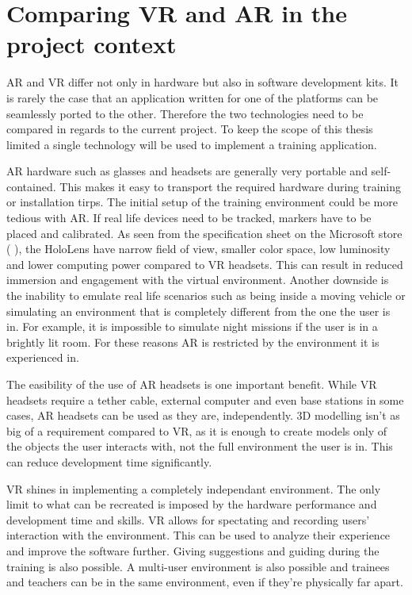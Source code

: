 \documentclass[12pt, a4paper,oneside, nocenter]{thesis}
\newcommand{\citeyeartitlexamkinline}[1]{(\usebibentry{#1}{title} \citeyear{#1})}
\begin{document}
\section{Comparing VR and AR in the project context}
AR and VR differ not only in hardware but also in software development kits. It is rarely the case that an application written for one of the platforms can be seamlessly ported to the other. Therefore the two technologies need to be compared in regards to the current project. To keep the scope of this thesis limited a single technology will be used to implement a training application.
\par
AR hardware such as glasses and headsets are generally very portable and self-contained. This makes it easy to transport the required hardware during training or installation tirps. The initial setup of the training environment could be more tedious with AR. If real life devices need to be tracked, markers have to be placed and calibrated. As seen from the specification sheet on the Microsoft store \citeyeartitlexamkinline{hololens-specs}, the HoloLens have narrow field of view, smaller color space, low luminosity and lower computing power compared to VR headsets. This can result in reduced immersion and engagement with the virtual environment. Another downside is the inability to emulate real life scenarios such as being inside a moving vehicle or simulating an environment that is completely different from the one the user is in. For example, it is impossible to simulate night missions if the user is in a brightly lit room. For these reasons AR is restricted by the environment it is experienced in.
\par
The easibility of the use of AR headsets is one important benefit. While VR headsets require a tether cable, external computer and even base stations in some cases, AR headsets can be used as they are, independently. 3D modelling isn't as big of a requirement compared to VR, as it is enough to create models only of the objects the user interacts with, not the full environment the user is in. This can reduce development time significantly.
\par
VR shines in implementing a completely independant environment. The only limit to what can be recreated is imposed by the hardware performance and development time and skills. VR allows for spectating and recording users' interaction with the environment. This can be used to analyze their experience and improve the software further. Giving suggestions and guiding during the training is also possible. A multi-user environment is also possible and trainees and teachers can be in the same environment, even if they're physically far apart.
\end{document}
